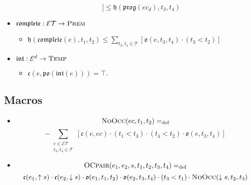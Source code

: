 \begin{itemize}
\begin{itemize}
\[				            ] \leq  \mathfrak{h}(\mathfrak{prog}(ec_d), t_3, t_4)\]
	      \end{itemize}
	\item $\mathfrak{complete} : \mathcal{ET} \to \textsc{Prem}$
	      \begin{itemize}
		      \item $\displaystyle \mathfrak{h}(\mathfrak{complete}(e), t_1, t_2) \leq
			            \sum_{ t_3, t_4 \in \mathcal{T}}[\mathfrak{o}(e, t_3, t_4) \cdot (t_3 < t_2)] $
	      \end{itemize}
	\item $\mathfrak{int} : \mathcal{E}^{d} \to \textsc{Temp}$
	      \begin{itemize}
		      \item $\mathfrak{c}(e, \mathfrak{po}(\mathfrak{int}(e))) = \top$.
	      \end{itemize}
\end{itemize}

\subsection{Macros}
\begin{itemize}
	\item \[\textsc{NoOcc}(ec, t_1, t_2) =_{\text{def}}\]
	      \[ -\sum_{\substack{{e \in \mathcal{ET}} \\ t_3, t_4 \in \mathcal{T}}}
		      [\mathfrak{c}(e, ec) \cdot (t_1 < t_3) \cdot (t_4 < t_2) \cdot \mathfrak{o}(e, t_3, t_4)]\]
	\item \[
		      \textsc{OCpair}(e_1, e_2, s, t_1, t_2, t_3, t_4) =_{\text{def}}
	      \]
	      \[
		      \mathfrak{c}(e_1, \uparrow s) \cdot \mathfrak{c}(e_2, \downarrow s) \cdot \mathfrak{o}(e_1, t_1, t_2) \cdot \mathfrak{o}(e_2, t_3, t_4) \cdot (t_3 < t_1) \cdot \textsc{NoOcc}(\downarrow s, t_2, t_3)
	      \]
\end{itemize}

